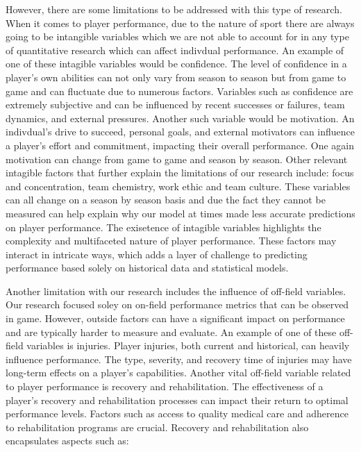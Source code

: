 \documentclass[12pt]{article}
\begin{document}
However, there are some limitations to be addressed with this type of research.
When it comes to player performance, due to the nature of sport there are always
going to be intangible variables which we are not able to account for in any type 
of quantitative research which can affect indivdual performance. An example of
one of these intagible variables would be confidence. The level of confidence 
in a player's own abilities can not only vary from season to season but from game to 
game and can fluctuate due to numerous factors. Variables such as confidence are 
extremely subjective and can be influenced by recent successes or failures,
team dynamics, and external pressures. Another such variable would be
motivation. An indivdual's drive to succeed, personal goals, and external
motivators can influence a player's effort and commitment, impacting their
overall performance. One again motivation can change from game to game and season 
by season. Other relevant intagible factors that further explain the limitations 
of our research include: focus and concentration, team chemistry, work ethic and 
team culture. These variables can all change on a season by season basis and due 
the fact they cannot be measured can help explain why our model at times made 
less accurate predictions on player performance.
The exisetence of intagible variables highlights the complexity and multifaceted
nature of player performance. These factors may interact in intricate ways,
which adds a layer of challenge to predicting performance based solely on historical
data and statistical models.

Another limitation with our research includes the influence of off-field variables.
Our research focused soley on on-field performance metrics that can be observed
in game. However, outside factors can have a significant
impact on performance and are typically harder to measure and evaluate.
An example of one of these off-field variables is injuries. 
Player injuries, both current and historical, can heavily influence performance.
The type, severity, and recovery time of injuries may have long-term effects on
a player's capabilities. Another vital off-field variable related to player
performance is recovery and rehabilitation. The effectiveness of a player's
recovery and rehabilitation processes can impact their return to optimal
performance levels. Factors such as access to quality medical care and adherence
to rehabilitation programs are crucial. Recovery and rehabilitation also
encapsulates aspects such as:
\end{document}
